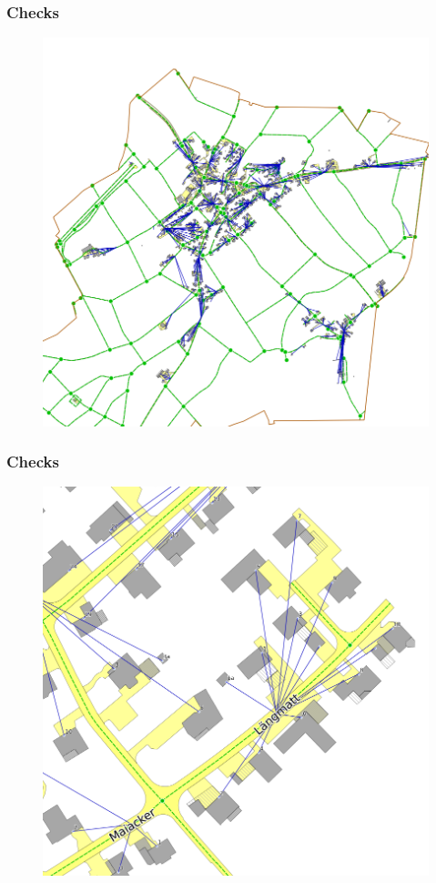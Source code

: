 \documentclass{beamer}
\begin{document}
\begin{frame}
  \frametitle{Checks}
  \begin{figure}
    \includegraphics[scale=0.3]{bilder/veriso_spinnennetz_1.png}
  \end{figure}
\end{frame}

\begin{frame}
  \frametitle{Checks}
  \begin{figure}
    \includegraphics[scale=0.3]{bilder/veriso_spinnennetz_2.png}
  \end{figure}
\end{frame}
\end{document}
